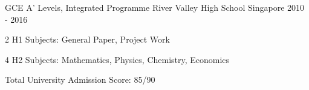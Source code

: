 

\begin{cventries}

    
  \cventry
    {GCE A' Levels, Integrated Programme} %
    {River Valley High School} %
    {Singapore} %
    {2010 - 2016} %
    {
      \begin{cvitems} %
        \item {2 H1 Subjects: General Paper, Project Work}
        \item {4 H2 Subjects: Mathematics, Physics, Chemistry, Economics}
        \item {Total University Admission Score: 85/90}
      \end{cvitems}
    }

\end{cventries}
